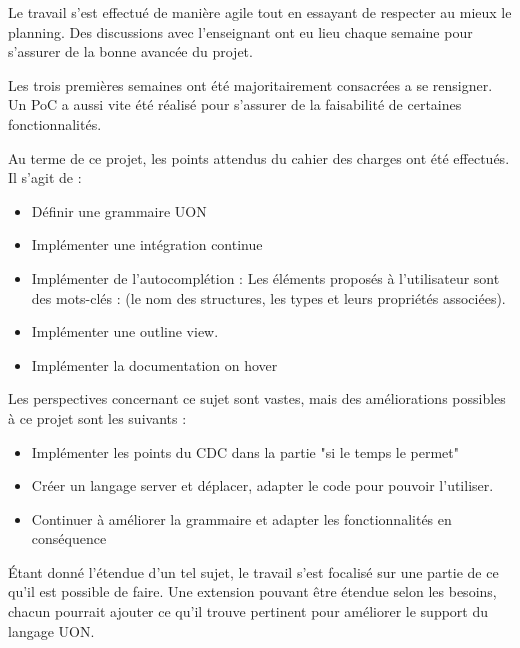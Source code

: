 Le travail s'est effectué de manière agile tout en essayant de respecter au mieux le planning.
Des discussions avec l'enseignant ont eu lieu chaque semaine pour s'assurer de la bonne avancée du projet.

Les trois premières semaines ont été majoritairement consacrées a se rensigner.
Un PoC a aussi vite été réalisé pour s'assurer de la faisabilité de certaines fonctionnalités.

Au terme de ce projet, les points attendus du cahier des charges ont été effectués. Il s'agit de :
\begin{itemize}
    \item Définir une grammaire UON
    \item Implémenter une intégration continue
    \item Implémenter de l'autocomplétion : Les éléments proposés à l'utilisateur sont des mots-clés : (le nom des structures, les types et leurs propriétés associées).
    \item Implémenter une outline view.
    \item Implémenter la documentation on hover
\end{itemize}

Les perspectives concernant ce sujet sont vastes, mais des améliorations possibles à ce projet sont les suivants :
\begin{itemize}
    \item Implémenter les points du CDC dans la partie "si le temps le permet"
    \item Créer un langage server et déplacer, adapter le code pour pouvoir l'utiliser.
    \item Continuer à améliorer la grammaire et adapter les fonctionnalités en conséquence
\end{itemize}

Étant donné l'étendue d'un tel sujet, le travail s'est focalisé sur une partie de ce qu'il est possible de faire.
Une extension pouvant être étendue selon les besoins, chacun pourrait ajouter ce qu'il trouve pertinent pour améliorer le support du langage UON.

